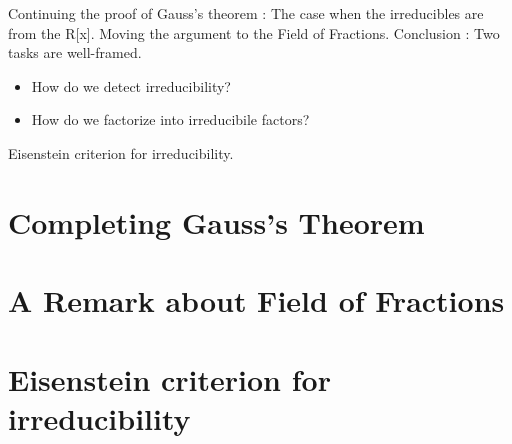 
\noindent
Continuing the proof of Gauss's theorem : The case when the irreducibles are from the R[x]. Moving the argument to the Field of Fractions.
Conclusion : Two tasks are well-framed.
\begin{itemize}
\item How do we detect irreducibility?
\item How do we factorize into irreducibile factors?
\end{itemize}

Eisenstein criterion for irreducibility. 

\section{Completing Gauss's Theorem}

\section{A Remark about Field of Fractions}

\section{Eisenstein criterion for irreducibility}
